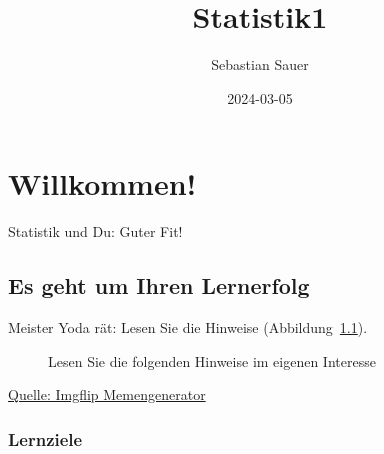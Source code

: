 \documentclass[
  a4paper,
  DIV=11]{scrreprt}
\title{Statistik1}
\author{Sebastian Sauer}
\date{2024-03-05}
\renewcommand*\contentsname{Inhaltsverzeichnis}
\newcommand\contentsname{Inhaltsverzeichnis}
\theoremstyle{definition}
\theoremstyle{definition}
\theoremstyle{definition}
\theoremstyle{remark}
\begin{document}
\maketitle

\renewcommand*\contentsname{Inhaltsverzeichnis}
{
\hypersetup{linkcolor=}
\setcounter{tocdepth}{2}
\tableofcontents
}
\chapter{Willkommen!}\label{willkommen}

Statistik und Du: Guter Fit!

\section{Es geht um Ihren Lernerfolg}\label{es-geht-um-ihren-lernerfolg}

Meister Yoda rät: Lesen Sie die Hinweise (Abbildung~\ref{fig-yoda}).

\begin{figure}


\caption{\label{fig-yoda}Lesen Sie die folgenden Hinweise im eigenen
Interesse}

\end{figure}%

\href{https://imgflip.com/memegenerator}{Quelle: Imgflip Memengenerator}

\subsection{Lernziele}\label{lernziele}
\end{document}
